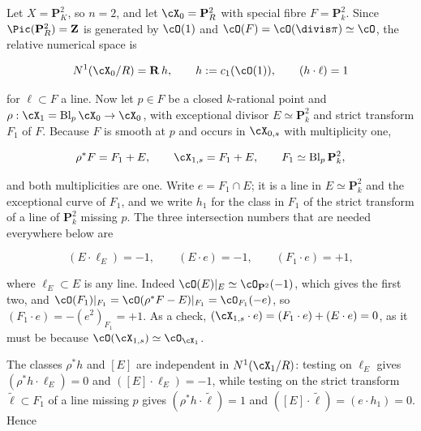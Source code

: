 \begin{example}
\label{ex:ch20-p2-blowup-numerics}
Let \(X=\mathbf P^2_K\), so \(n=2\), and let \(\cX_0=\mathbf P^2_R\) with
special fibre \(F=\mathbf P^2_k\).  Since \(\Pic(\mathbf P^2_R)=\mathbf Z\)
is generated by \(\cO(1)\) and \(\cO(F)=\cO(\divis\pi)\simeq\cO\), the
relative numerical space is

\begin{equation}
\label{eq:ch20-p2-n1}
 N^1(\cX_0/R)=\mathbf R\,h,\qquad h:=c_1(\cO(1)),
 \qquad (h\cdot\ell)=1
\end{equation}

for \(\ell\subset F\) a line.  Now let \(p\in F\) be a closed \(k\)-rational
point and \(\rho:\cX_1=\operatorname{Bl}_p\cX_0\to\cX_0\), with exceptional
divisor \(E\simeq\mathbf P^2_k\) and strict transform \(F_1\) of \(F\).
Because \(F\) is smooth at \(p\) and occurs in \(\cX_{0,s}\) with
multiplicity one,

\begin{equation}
\label{eq:ch20-p2-special-fibre}
 \rho^*F=F_1+E,
 \qquad
 \cX_{1,s}=F_1+E,
 \qquad
 F_1\simeq\operatorname{Bl}_p\mathbf P^2_k,
\end{equation}

and both multiplicities are one.  Write \(e=F_1\cap E\); it is a line in
\(E\simeq\mathbf P^2_k\) and the exceptional curve of \(F_1\), and we write
\(h_1\) for the class in \(F_1\) of the strict transform of a line of
\(\mathbf P^2_k\) missing \(p\).  The three intersection numbers that are
needed everywhere below are

\begin{equation}
\label{eq:ch20-p2-blowup-table}
 (E\cdot\ell_E)=-1,\qquad
 (E\cdot e)=-1,\qquad
 (F_1\cdot e)=+1,
\end{equation}

where \(\ell_E\subset E\) is any line.  Indeed
\(\cO(E)|_E\simeq\cO_{\mathbf P^2}(-1)\), which gives the first two, and
\(\cO(F_1)|_{F_1}=\cO(\rho^*F-E)|_{F_1}=\cO_{F_1}(-e)\), so
\((F_1\cdot e)=-(e^2)_{F_1}=+1\).  As a check,
\((\cX_{1,s}\cdot e)=(F_1\cdot e)+(E\cdot e)=0\), as it must be because
\(\cO(\cX_{1,s})\simeq\cO_{\cX_1}\).

The classes \(\rho^*h\) and \([E]\) are independent in \(N^1(\cX_1/R)\):
testing on \(\ell_E\) gives \((\rho^*h\cdot\ell_E)=0\) and
\(([E]\cdot\ell_E)=-1\), while testing on the strict transform
\(\tilde\ell\subset F_1\) of a line missing \(p\) gives
\((\rho^*h\cdot\tilde\ell)=1\) and \(([E]\cdot\tilde\ell)=(e\cdot h_1)=0\).
Hence


\end{example}
